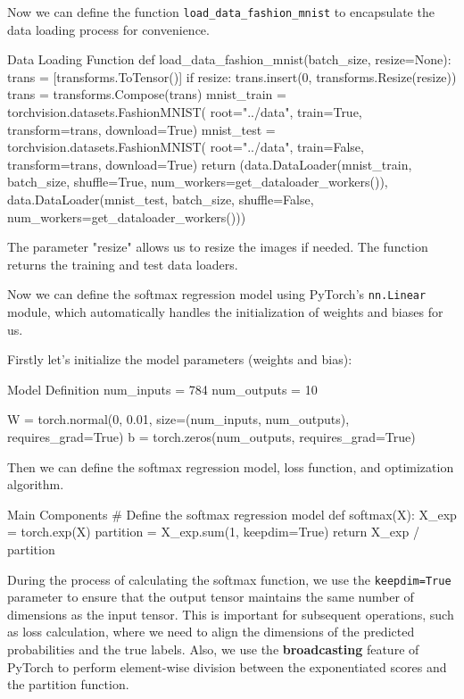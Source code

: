 Now we can define the function \texttt{load\_data\_fashion\_mnist} to encapsulate the data loading process for convenience.

\begin{pythoncode}{Data Loading Function}
def load_data_fashion_mnist(batch_size, resize=None):
    trans = [transforms.ToTensor()]
    if resize:
        trans.insert(0, transforms.Resize(resize))
    trans = transforms.Compose(trans)
    mnist_train = torchvision.datasets.FashionMNIST(
        root="../data", train=True, transform=trans, download=True)
    mnist_test = torchvision.datasets.FashionMNIST(
        root="../data", train=False, transform=trans, download=True)
    return (data.DataLoader(mnist_train, batch_size, shuffle=True,
                            num_workers=get_dataloader_workers()),
            data.DataLoader(mnist_test, batch_size, shuffle=False,
                            num_workers=get_dataloader_workers()))
\end{pythoncode}

The parameter "resize" allows us to resize the images if needed. The function returns the training and test data loaders.

Now we can define the softmax regression model using PyTorch's \texttt{nn.Linear} module, which automatically handles the initialization of weights and biases for us.

Firstly let's initialize the model parameters (weights and bias):

\begin{pythoncode}{Model Definition}
num_inputs = 784
num_outputs = 10

W = torch.normal(0, 0.01, size=(num_inputs, num_outputs), requires_grad=True)
b = torch.zeros(num_outputs, requires_grad=True)
\end{pythoncode}

Then we can define the softmax regression model, loss function, and optimization algorithm.

\begin{pythoncode}{Main Components}
# Define the softmax regression model
def softmax(X):
    X_exp = torch.exp(X)
    partition = X_exp.sum(1, keepdim=True)
    return X_exp / partition
\end{pythoncode}

During the process of calculating the softmax function, we use the \texttt{keepdim=True} parameter to ensure that the output tensor maintains the same number of dimensions as the input tensor. This is important for subsequent operations, such as loss calculation, where we need to align the dimensions of the predicted probabilities and the true labels. Also, we use the \textbf{broadcasting} feature of PyTorch to perform element-wise division between the exponentiated scores and the partition function.

